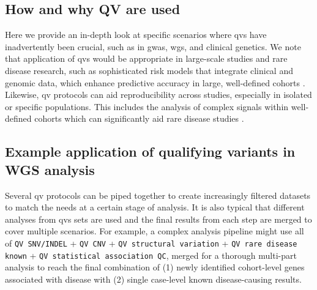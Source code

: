 \subsection{How and why QV are used}
Here we provide an in-depth look at specific scenarios where \ac{qv}s  have inadvertently been crucial, such as in \ac{gwas}, \ac{wgs}, and clinical genetics. 
We note that application of \ac{qv}s would be appropriate in large-scale studies and rare disease research, such as sophisticated risk models that integrate clinical and genomic data, which enhance predictive accuracy in large, well-defined cohorts \cite{riveros2021integrated, weale2021validation, sun2021polygenic}.
Likewise, \ac{qv} protocols can aid reproducibility across studies, especially in isolated or specific populations. This includes the analysis of complex signals within well-defined cohorts which can significantly aid rare disease studies \cite{lim2014distribution}. %

\subsection{Example application of qualifying variants in WGS analysis}

Several \ac{qv} protocols can be piped together to create increasingly filtered datasets to match the needs at a certain stage of analysis. It is also typical that different analyses from \ac{qv}s sets are used and the final results from each step are merged to cover multiple scenarios. For example, a complex analysis pipeline might use all of
\colorbox{kispiblue!30}{\texttt{QV SNV/INDEL}} + 
\colorbox{kispiblue!30}{\texttt{QV CNV}} + 
\colorbox{kispiblue!30}{\texttt{QV structural variation}} + 
\colorbox{kispiblue!30}{\texttt{QV rare disease known}} + 
\colorbox{kispiblue!30}{\texttt{QV statistical association QC}}, merged for a thorough multi-part analysis to reach the final combination of (1) newly identified cohort-level genes associated with disease with (2) single case-level known disease-causing results.

